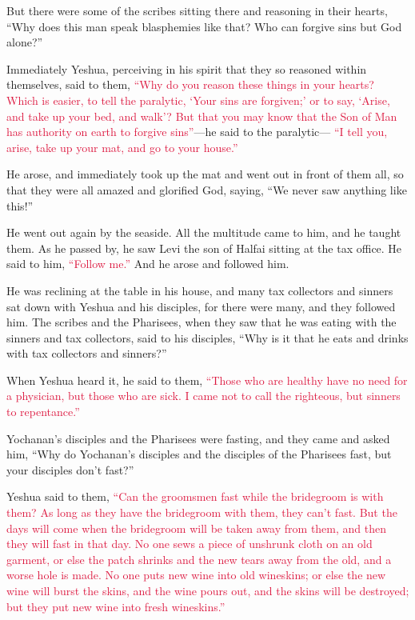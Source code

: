 \myverse{}But there were some of the scribes sitting there and reasoning
in their hearts,
\myverse{}“Why does this man speak blasphemies like that? Who can forgive sins but God
alone?”

\myverse{}Immediately Yeshua, perceiving in his spirit that they so reasoned
within themselves, said to them,
\textcolor{crimson}{“Why do you reason these things in your hearts?
}
\myverse{}\textcolor{crimson}{Which is easier, to tell the paralytic, ‘Your sins are forgiven;’ or to
	say, ‘Arise, and take up your bed, and walk’?
}
\myverse{}\textcolor{crimson}{But that you may know that the Son of Man has authority on earth to forgive
	sins”}—he said to the paralytic—
\myverse{}\textcolor{crimson}{“I tell you, arise, take up your mat, and go to your house.”
}

\myverse{}He arose, and immediately took up the mat and went out in front
of them all, so that they were all amazed and glorified God, saying, “We never saw anything like this!”

\myverse{}He went out again by the seaside. All the multitude came to him,
and he taught them.
\myverse{}As he passed by, he saw Levi the son of Halfai sitting at the tax office.
He said to him,
\textcolor{crimson}{“Follow me.”} And he arose and followed him.

\myverse{}He was reclining at the table in his house, and many tax collectors
and sinners sat down with Yeshua and his disciples, for there were many, and they followed him.
\myverse{}The scribes and the Pharisees, when they saw that he was eating with the sinners
and tax collectors, said to his disciples, “Why is it that he eats and drinks with tax collectors and
sinners?”

\myverse{}When Yeshua heard it, he said to them,
\textcolor{crimson}{“Those who are healthy have no need for a physician, but those who are sick. I came not to call the
	righteous, but sinners to repentance.”}

\myverse{}Yochanan’s disciples and the Pharisees were fasting, and they
came and asked him, “Why do Yochanan’s disciples and the disciples of the Pharisees fast, but your disciples
don’t fast?”

\myverse{}Yeshua said to them,
\textcolor{crimson}{“Can the groomsmen fast while the bridegroom is with them? As long as they have the bridegroom with
	them, they can’t fast.
}
\myverse{}\textcolor{crimson}{But the days will come when the bridegroom will be taken away from them,
	and then they will fast in that day.
}
\myverse{}\textcolor{crimson}{No one sews a piece of unshrunk cloth on an old garment, or else the patch
	shrinks and the new tears away from the old, and a worse hole is made.
}
\myverse{}\textcolor{crimson}{No one puts new wine into old wineskins; or else the new wine will burst
	the skins, and the wine pours out, and the skins will be destroyed; but they put new wine into fresh wineskins.”}

